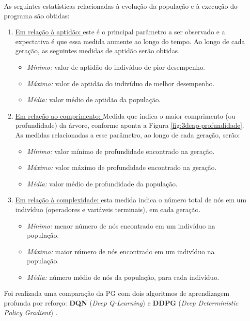 As seguintes estatísticas relacionadas à evolução da população e à execução do programa são obtidas:

\begin{enumerate}[label=\alph*)]
	\item \underline{Em relação à aptidão: } este é o principal parâmetro a ser observado e a expectativa é que essa medida aumente ao longo do tempo. Ao longo de cada geração, as seguintes medidas de aptidão serão obtidas.
	\begin{itemize}[label=\raisebox{0.25ex}{\tiny$\bullet$}]
		\item \textit{Mínimo: } valor de aptidão do indivíduo de pior desempenho.
		\item \textit{Máximo: } valor de aptidão do indivíduo de melhor desempenho.
		\item \textit{Média: } valor médio de aptidão da população.
	\end{itemize}
	\item \underline{Em relação ao comprimento: } Medida que indica o maior comprimento (ou profundidade) da árvore, conforme aponta a Figura \ref{fig:3deap-profundidade}. As medidas relacionadas a esse parâmetro, ao longo de cada geração, serão:
	\begin{itemize}[label=\raisebox{0.25ex}{\tiny$\bullet$}]
		\item \textit{Mínimo: } valor mínimo de profundidade encontrado na geração.
		\item \textit{Máximo: } valor máximo de profundidade encontrado na geração.
		\item \textit{Média: } valor médio de profundidade da população.
	\end{itemize}
	\item \underline{Em relação à complexidade: } esta medida indica o número total de nós em um indivíduo (operadores e variáveis terminais), em cada geração.
	\begin{itemize}[label=\raisebox{0.25ex}{\tiny$\bullet$}]
		\item \textit{Mínimo: } menor número de nós encontrado em um indivíduo na população.
		\item \textit{Máximo: } maior número de nós encontrado em um indivíduo na população.
		\item \textit{Média: } número médio de nós da população, para cada indivíduo.
	\end{itemize}
\end{enumerate}

Foi realizada uma comparação da PG com dois algoritmos de aprendizagem profunda por reforço: \textbf{DQN} (\textit{Deep Q-Learning}) \cite{silver2013dqn} e \textbf{DDPG} (\textit{Deep Deterministic Policy Gradient}) \cite{lili2015ddpg}.

